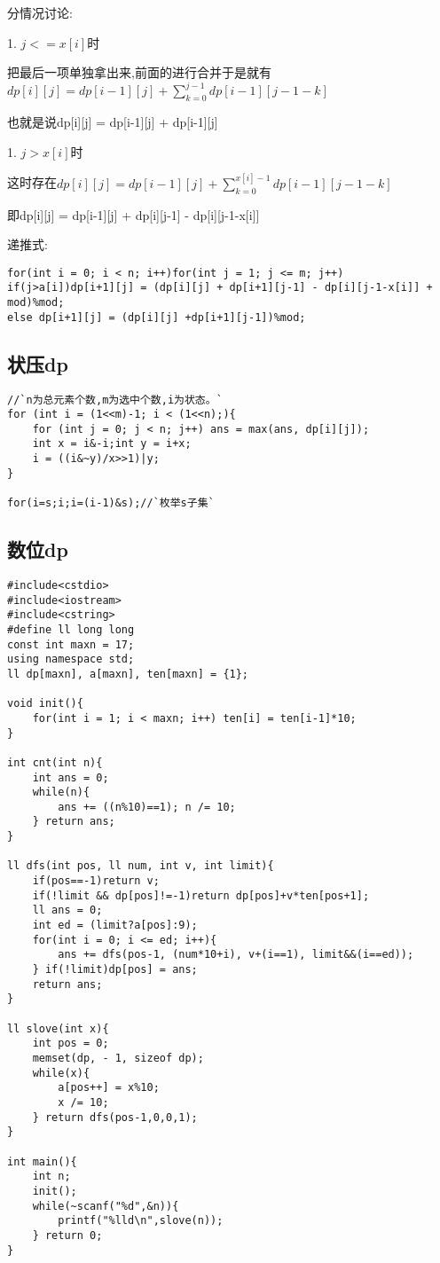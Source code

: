 分情况讨论:

1. $j<=x[i]$时

把最后一项单独拿出来,前面的进行合并于是就有$dp[i][j] = dp[i-1][j] + \sum_{k=0}^{j-1}dp[i-1][j-1-k]$

也就是说dp[i][j] = dp[i-1][j] + dp[i-1][j]

1. $j>x[i]$时

这时存在$dp[i][j]  = dp[i-1][j] + \sum_{k=0}^{x[i]-1}dp[i-1][j-1-k]$

即dp[i][j] = dp[i-1][j] + dp[i][j-1] - dp[i][j-1-x[i]]  

递推式:

\begin{lstlisting}
for(int i = 0; i < n; i++)for(int j = 1; j <= m; j++)
if(j>a[i])dp[i+1][j] = (dp[i][j] + dp[i+1][j-1] - dp[i][j-1-x[i]] + mod)%mod;
else dp[i+1][j] = (dp[i][j] +dp[i+1][j-1])%mod;
\end{lstlisting}



\subsection{状压dp}


\begin{lstlisting}
//`n为总元素个数,m为选中个数,i为状态。`
for (int i = (1<<m)-1; i < (1<<n);){
    for (int j = 0; j < n; j++) ans = max(ans, dp[i][j]);
    int x = i&-i;int y = i+x;
    i = ((i&~y)/x>>1)|y;
}

for(i=s;i;i=(i-1)&s);//`枚举s子集`
\end{lstlisting}


\subsection{数位dp}


\begin{lstlisting}
#include<cstdio>
#include<iostream>
#include<cstring>
#define ll long long
const int maxn = 17;
using namespace std;
ll dp[maxn], a[maxn], ten[maxn] = {1};

void init(){
    for(int i = 1; i < maxn; i++) ten[i] = ten[i-1]*10;
}

int cnt(int n){
    int ans = 0;
    while(n){
        ans += ((n%10)==1); n /= 10;
    } return ans;
}

ll dfs(int pos, ll num, int v, int limit){
    if(pos==-1)return v;
    if(!limit && dp[pos]!=-1)return dp[pos]+v*ten[pos+1];
    ll ans = 0;
    int ed = (limit?a[pos]:9);
    for(int i = 0; i <= ed; i++){
        ans += dfs(pos-1, (num*10+i), v+(i==1), limit&&(i==ed));
    } if(!limit)dp[pos] = ans;
    return ans;
}

ll slove(int x){
    int pos = 0;
    memset(dp, - 1, sizeof dp);
    while(x){
        a[pos++] = x%10;
        x /= 10;
    } return dfs(pos-1,0,0,1);
}

int main(){
    int n;
    init();
    while(~scanf("%d",&n)){
        printf("%lld\n",slove(n));
    } return 0;
}
\end{lstlisting}



